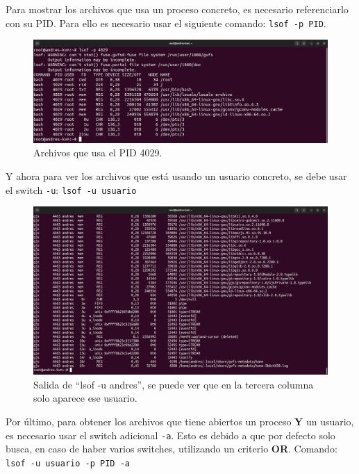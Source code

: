 \documentclass{article}
\begin{document}
\bigskip

Para mostrar los archivos que usa un proceso concreto, es necesario referenciarlo con su PID. Para ello es necesario usar el siguiente comando: \verb|lsof -p PID|.

\begin{figure}[H]
    \includegraphics[width=\textwidth]{imagenes/lsofp.png}
    \caption{Archivos que usa el PID 4029.}
\end{figure} 


Y ahora para ver los archivos que está usando un usuario concreto, se debe usar el switch \verb|-u|: \verb|lsof -u usuario|

\begin{figure}[H]
    \includegraphics[width=\textwidth]{imagenes/lsofuandres.png}
    \caption{Salida de ``lsof -u andres'', se puede ver que en la tercera columna solo aparece ese usuario.}
\end{figure}

\bigskip

\newpage

Por último, para obtener los archivos que tiene abiertos un proceso \textbf{Y} un usuario, es necesario usar el switch adicional \verb|-a|. Esto es debido a que por defecto solo busca, en caso de haber varios switches, utilizando un criterio \textbf{OR}. Comando: \verb|lsof -u usuario -p PID -a|
\end{document}
